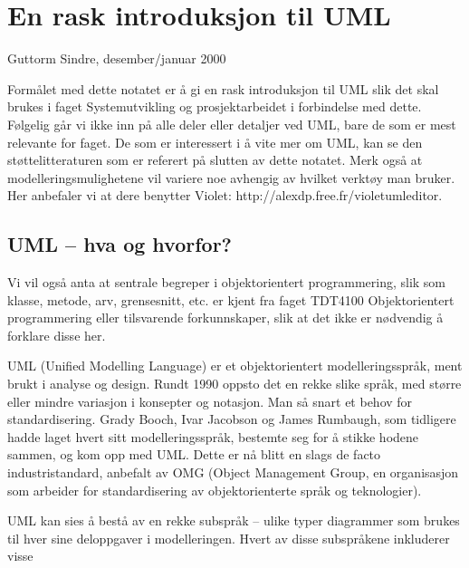 \section{En rask introduksjon til UML}
Guttorm Sindre, desember/januar 2000

Formålet med dette notatet er å gi en rask introduksjon til UML slik det skal brukes i faget Systemutvikling og prosjektarbeidet i forbindelse med dette. Følgelig går vi ikke inn på alle deler eller detaljer ved UML, bare de som er mest relevante for faget. De som er interessert i å vite mer om UML, kan se den støttelitteraturen som er referert på slutten av dette notatet. Merk også at modelleringsmulighetene vil variere noe avhengig av hvilket verktøy man bruker. Her anbefaler vi at dere benytter Violet: http://alexdp.free.fr/violetumleditor.

\subsection{UML – hva og hvorfor?}
Vi vil også anta at sentrale begreper i objektorientert programmering, slik som klasse, metode, arv, grensesnitt, etc. er kjent fra faget TDT4100 Objektorientert programmering eller tilsvarende forkunnskaper, slik at det ikke er nødvendig å forklare disse her.

UML (Unified Modelling Language) er et objektorientert modelleringsspråk, ment brukt i analyse og design. Rundt 1990 oppsto det en rekke slike språk, med større eller mindre variasjon i konsepter og notasjon. Man så snart et behov for standardisering. Grady Booch, Ivar Jacobson og James Rumbaugh, som tidligere hadde laget hvert sitt modelleringsspråk, bestemte seg for å stikke hodene sammen, og kom opp med UML. Dette er nå blitt en slags de facto industristandard, anbefalt av OMG (Object Management Group, en organisasjon som arbeider for standardisering av objektorienterte språk og teknologier).

UML kan sies å bestå av en rekke subspråk – ulike typer diagrammer som brukes til hver sine deloppgaver i modelleringen. Hvert av disse subspråkene inkluderer visse

